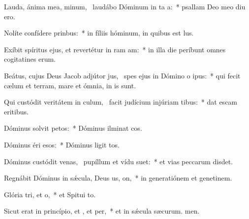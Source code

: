 \item Lauda, ánima mea, minum,~\pscross{} laudábo Dóminum in ta a:~* psallam Deo meo diu ero.
\item Nolíte confídere  prinbus:~* in fíliis hóminum, in quibus  est lus.
\item Exíbit spíritus ejus, et revertétur in ram am:~* in illa die períbunt omnes cogitatines erum.
\item Beátus, cujus Deus Jacob adjútor jus,~\pscross{} spes ejus in Dómino o ipus:~* qui fecit cælum et terram, mare et ómnia,  in is sunt.
\item Qui custódit veritátem in culum,~\pscross{} facit judícium injúriam tibus:~* dat escam eritibus.
\item Dóminus solvit petos:~* Dóminus ilminat cos.
\item Dóminus éri esos:~* Dóminus ligit tos.
\item Dóminus custódit venas,~\pscross{} pupíllum et vídu suet:~* et vias peccarum disdet.
\item Regnábit Dóminus in sǽcula, Deus us, on,~* in generatiónem et genetinem.
\item Glória tri, et o,~* et Spitui to.
\item Sicut erat in princípio, et , et per,~* et in sǽcula sæcurum. men.
